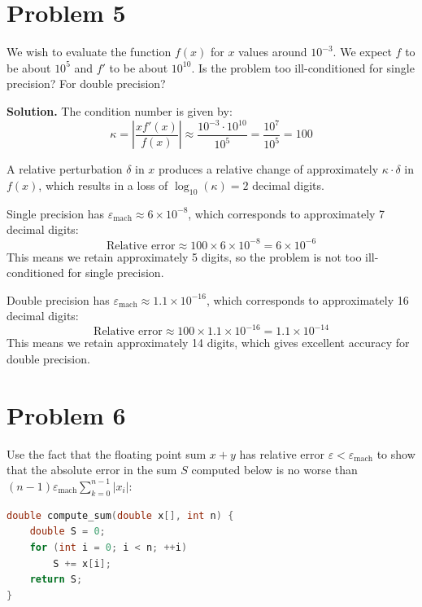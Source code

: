 \documentclass[letterpaper, 11pt]{article}
\newcommand{\1}{\mathds{1}}	%
\theoremstyle{definition}
\begin{document}
\section*{Problem 5}

We wish to evaluate the function $f(x)$ for $x$ values around $10^{-3}$. We expect $f$ to be about $10^5$ and $f'$ to be about $10^{10}$. Is the problem too ill-conditioned for single precision? For double precision?

\medskip

\textbf{Solution.} The condition number is given by:
\[
\kappa = \left|\frac{x f'(x)}{f(x)}\right| \approx \frac{10^{-3} \cdot 10^{10}}{10^5} = \frac{10^7}{10^5} = 100
\]

A relative perturbation $\delta$ in $x$ produces a relative change of approximately $\kappa \cdot \delta$ in $f(x)$, which results in a loss of $\log_{10}(\kappa) = 2$ decimal digits.

Single precision has $\varepsilon_{\mathrm{mach}} \approx 6 \times 10^{-8}$, which corresponds to approximately 7 decimal digits:
\[
\text{Relative error} \approx 100 \times 6 \times 10^{-8} = 6 \times 10^{-6}
\]
This means we retain approximately 5 digits, so the problem is not too ill-conditioned for single precision.

Double precision has $\varepsilon_{\mathrm{mach}} \approx 1.1 \times 10^{-16}$, which corresponds to approximately 16 decimal digits:
\[
\text{Relative error} \approx 100 \times 1.1 \times 10^{-16} = 1.1 \times 10^{-14}
\]
This means we retain approximately 14 digits, which gives excellent accuracy for double precision.

\section*{Problem 6}

Use the fact that the floating point sum $x + y$ has relative error $\varepsilon < \varepsilon_{\mathrm{mach}}$ to show that the absolute error in the sum $S$ computed below is no worse than $(n-1)\varepsilon_{\mathrm{mach}} \sum_{k=0}^{n-1}|x_i|$:
\begin{lstlisting}[language=C, numbers=none]
double compute_sum(double x[], int n) {
    double S = 0;
    for (int i = 0; i < n; ++i)
        S += x[i];
    return S;
}
\end{lstlisting}
\end{document}
